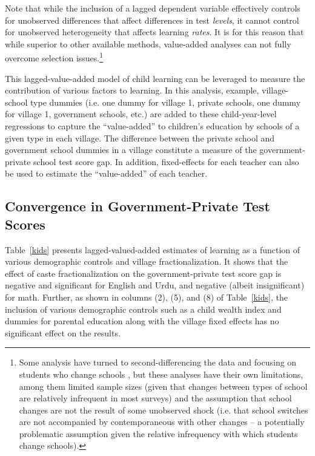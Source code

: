 \documentclass[Eubank_pk_ethnic_sorting.tex]{subfiles}
\begin{document}
Note that while the inclusion of a lagged dependent variable effectively controls for unobserved differences that affect differences in test \emph{levels}, it cannot control for unobserved heterogeneity that affects learning \emph{rates}. It is for this reason that while superior to other available methods, value-added analyses can not fully overcome selection issues.\footnote{Some analysis have turned to second-differencing the data and focusing on students who change schools \citep{Andrabi:2011hl}, but these analyses have their own limitations, among them limited sample sizes (given that changes between types of school are relatively infrequent in most surveys) and the assumption that school changes are not the result of some unobserved shock (i.e. that school switches are not accompanied by contemporaneous with other changes -- a potentially problematic assumption given the relative infrequency with which students change schools).}

This lagged-value-added model of child learning can be leveraged to measure the contribution of various factors to learning. In this analysis, example, village-school type dummies (i.e. one dummy for village 1, private schools, one dummy for village 1, government schools, etc.) are added to these child-year-level regressions to capture the ``value-added'' to children's education by schools of a given type in each village. The difference between the private school and government school dummies in a village constitute a measure of the government-private school test score gap. In addition, fixed-effects for each teacher can also be used to estimate the ``value-added'' of each teacher. 

\subsection{Convergence in Government-Private Test Scores}\label{}


Table~\ref{kids} presents lagged-valued-added estimates of learning as a function of various demographic controls and village fractionalization. It shows that the effect of caste fractionalization on the government-private test score gap is negative and significant for English and Urdu, and negative (albeit insignificant) for math. Further, as shown in columns (2), (5), and (8) of Table~\ref{kids}, the inclusion of various demographic controls such as a child wealth index and dummies for parental education along with the village fixed effects has no significant effect on the results. 
\end{document}
